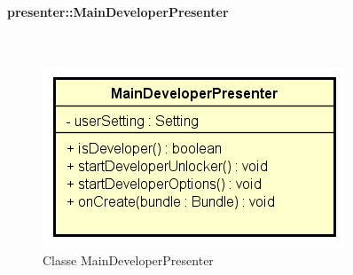 \documentclass[../DefinizioneDiProdotto.tex]{subfiles}
\begin{document}
\paragraph{presenter::MainDeveloperPresenter}
\
\begin{figure}[H]
	\centering
	\includegraphics[width=\maxwidth]{img/MainDeveloperPresenter.png}
	\caption{Classe MainDeveloperPresenter}\label{fig:presenter::MainDeveloperPresenter} 
\end{figure}
\end{document}
